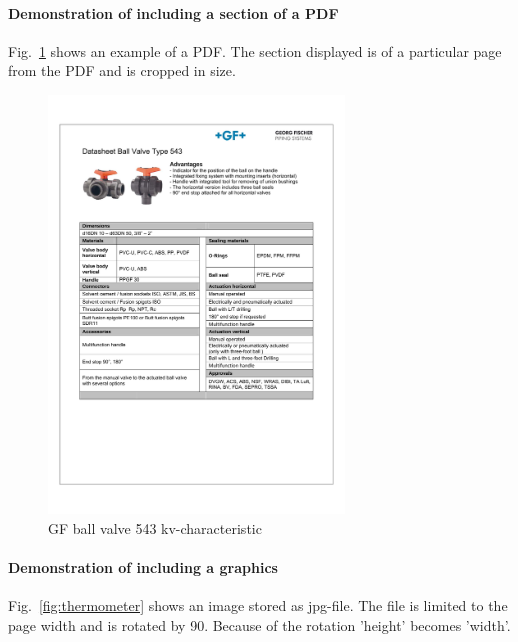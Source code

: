 \paragraph{Demonstration of including a section of a PDF}
Fig.~\ref{fig:GF543kv} shows an example of a PDF. The section displayed is of a particular page from the PDF and is cropped in size.
\begin{figure}
	\centering
	\includegraphics[width=0.7\textwidth,page=6, trim = 25mm 172mm 25mm 45mm, clip]{600-Appendices/Examples/Datasheet_GF_543}
	\caption{GF ball valve 543 kv-characteristic}
	\label{fig:GF543kv}
\end{figure}

\paragraph{Demonstration of including a graphics}
Fig.~\ref{fig:thermometer} shows an image stored as jpg-file. The file is limited to the page width and is rotated by 90\textdegree. Because of the rotation 'height' becomes 'width'.

